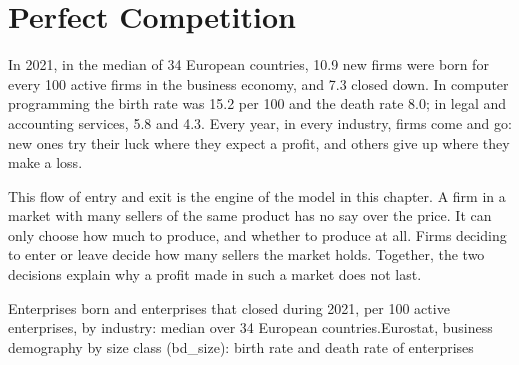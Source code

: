 \chapter{Perfect Competition}\label{ch:g11:perfect-competition}

In 2021, in the median of 34 European countries, 10.9 new firms were born for every 100 active firms in the business economy, and 7.3 closed
down. In computer programming the birth rate was 15.2 per 100 and the death rate 8.0; in legal and accounting services, 5.8 and 4.3. Every year,
in every industry, firms come and go: new ones try their luck where they expect a profit, and others give up where they make a loss.

This flow of entry and exit is the engine of the model in this chapter. A firm in a market with many sellers of the same product has no say over
the price. It can only choose how much to produce, and whether to produce at all. Firms deciding to enter or leave decide how many sellers the
market holds. Together, the two decisions explain why a profit made in such a market does not last.

\begin{openingchart}{Enterprises born and enterprises that closed during 2021, per 100 active enterprises, by industry: median over 34 European countries.}{Eurostat,
business demography by size class (bd\_size): birth rate and death rate of enterprises}
\end{openingchart}

